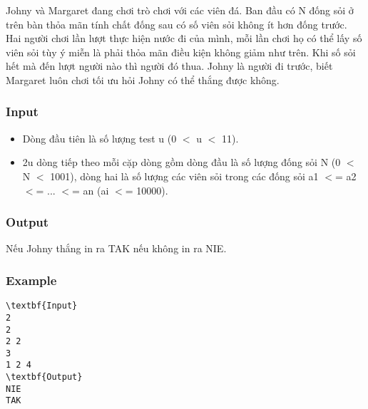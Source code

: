 







   Johny và Margaret đang chơi trò chơi với các viên đá. Ban đầu có N đống sỏi ở trên bàn thỏa mãn tính chất đống sau có số viên sỏi không ít hơn đống trước. Hai người chơi lần lượt thực hiện nước đi của mình, mỗi lần chơi họ có thể lấy số viên sỏi tùy ý miễn là phải thỏa mãn điều kiện không giảm như trên. Khi số sỏi hết mà đến lượt người nào thì người đó thua. Johny là người đi trước, biết Margaret luôn chơi tối ưu hỏi Johny có thể thắng được không.  

\subsubsection{   Input  }
\begin{itemize}
	\item     Dòng đầu tiên là số lượng test u (0 $<$ u $<$ 11).   
	\item     2u dòng tiếp theo mỗi cặp dòng gồm dòng đầu là số lượng đống sỏi N (0 $<$ N $<$ 1001), dòng hai là số lượng các viên sỏi trong các đống sỏi a1 $<$= a2 $<$= ... $<$= an (ai $<$= 10000).   
\end{itemize}

\subsubsection{   Output  }

   Nếu Johny thắng in ra TAK nếu không in ra NIE.  

\subsubsection{   Example  }
\begin{verbatim}
\textbf{Input} 
2
2
2 2
3
1 2 4
\textbf{Output} 
NIE
TAK
\end{verbatim}

